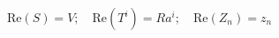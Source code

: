 \begin{equation}
\textrm{Re}(S) = V; \quad \textrm{Re}(T^{i}) = Ra^{i}; \quad
\textrm{Re}(Z_{n}) = z_{n}
\end{equation}

